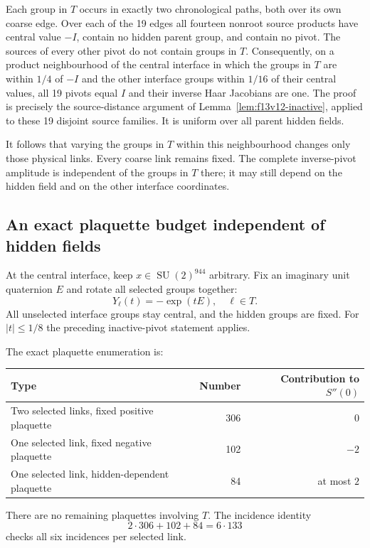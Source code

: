 \documentclass[11pt,oneside]{article}
\DeclareMathOperator{\SU}{SU}
\begin{document}
Each group in \(T\) occurs in exactly two
chronological paths, both over its own coarse
edge. Over each of the 19 edges all fourteen
nonroot source products have central value
\(-I\), contain no hidden parent group, and
contain no pivot. The sources of every other
pivot do not contain groups in \(T\).
Consequently, on a product neighbourhood of
the central interface in which the groups in
\(T\) are within \(1/4\) of \(-I\) and the
other interface groups within \(1/16\) of
their central values, all 19 pivots equal
\(I\) and their inverse Haar Jacobians are one.
The proof is precisely the source-distance
argument of Lemma~\ref{lem:f13v12-inactive},
applied to these 19 disjoint source families.
It is uniform over all parent hidden fields.

It follows that varying the groups in \(T\)
within this neighbourhood changes only those
physical links. Every coarse link remains
fixed. The complete inverse-pivot amplitude
is independent of the groups in \(T\) there;
it may still depend on the hidden field and
on the other interface coordinates.

\subsection{An exact plaquette budget independent of hidden fields}

At the central interface, keep \(x\in\SU(2)^{944}\)
arbitrary. Fix an imaginary unit quaternion \(E\)
and rotate all selected groups together:
\[
             Y_\ell(t)=-\exp(tE),\quad \ell\in T .
\]
All unselected interface groups stay central,
and the hidden groups are fixed. For \(|t|\le1/8\)
the preceding inactive-pivot statement applies.

The exact plaquette enumeration is:
\begin{center}
\begin{tabular}{lrr}
\toprule
Type&Number&Contribution to \(S''(0)\)\\
\midrule
Two selected links, fixed positive plaquette&306&0\\
One selected link, fixed negative plaquette&102&\(-2\)\\
One selected link, hidden-dependent plaquette&84&at most \(2\)\\
\bottomrule
\end{tabular}
\end{center}
There are no remaining plaquettes involving \(T\).
The incidence identity
\[
                  2\cdot306+102+84=6\cdot133
\]
checks all six incidences per selected link.
\end{document}
